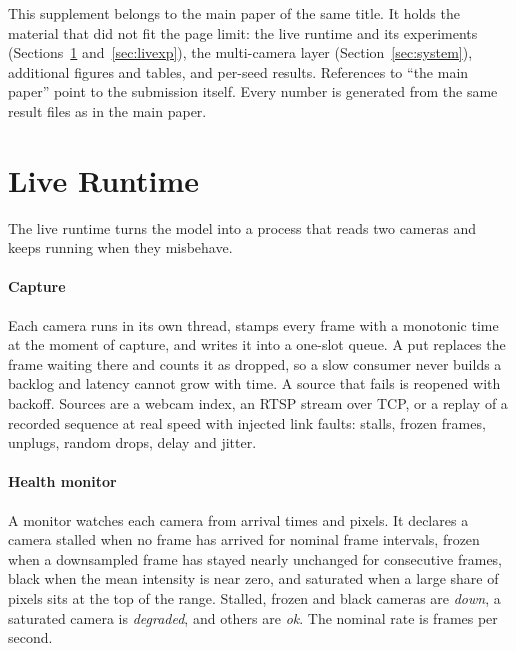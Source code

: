 \noindent This supplement belongs to the main paper of the same title. It holds the material that did not fit the page limit: the live runtime and its experiments (Sections~\ref{sec:live} and~\ref{sec:livexp}), the multi-camera layer (Section~\ref{sec:system}), additional figures and tables, and per-seed results. References to ``the main paper'' point to the submission itself. Every number is generated from the same result files as in the main paper.

\section{Live Runtime}
\label{sec:live}
The live runtime turns the model into a process that reads two cameras and keeps running when they misbehave.

\paragraph{Capture}
Each camera runs in its own thread, stamps every frame with a monotonic time at the moment of capture, and writes it into a one-slot queue. A put replaces the frame waiting there and counts it as dropped, so a slow consumer never builds a backlog and latency cannot grow with time. A source that fails is reopened with backoff. Sources are a webcam index, an RTSP stream over TCP, or a replay of a recorded sequence at real speed with injected link faults: stalls, frozen frames, unplugs, random drops, delay and jitter.

\paragraph{Health monitor}
A monitor watches each camera from arrival times and pixels. It declares a camera stalled when no frame has arrived for \cfgStallIntervals{} nominal frame intervals, frozen when a downsampled frame has stayed nearly unchanged for \cfgFreezeFrames{} consecutive frames, black when the mean intensity is near zero, and saturated when a large share of pixels sits at the top of the range. Stalled, frozen and black cameras are \emph{down}, a saturated camera is \emph{degraded}, and others are \emph{ok}. The nominal rate is \cfgNominalFps{} frames per second.

